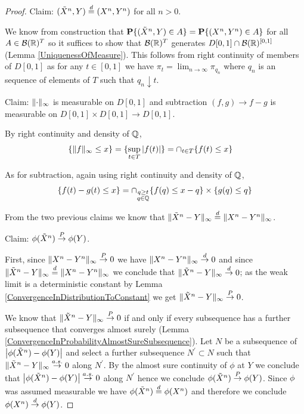 \begin{proof}
Claim: $(\tilde{X}^n, Y) \overset{d}= (X^n, Y^n)$ for all $n > 0$.

We know from construction that $\textbf{P}\{(\tilde{X}^n, Y) \in A\} =
\textbf{P}\{(X^n,Y^n) \in A\}$ for all $A \in \mathcal{B}(\mathbb{R})^T$
so it suffices to show that $\mathcal{B}(\mathbb{R})^T$ generates $D[0,1]
\cap \mathcal{B}(\mathbb{R})^{[0,1]}$ (Lemma \ref{UniquenessOfMeasure}).
This follows from right continuity of members of $D[0,1]$ as for any
$t \in [0,1]$ we have $\pi_t =\lim_{n \to \infty} \pi_{q_n}$ where
$q_n$ is an sequence of elements of $T$ such that $q_n \downarrow t$.

Claim: $\lVert \cdot \rVert_\infty$ is measurable on $D[0,1]$ and
subtraction $(f,g) \to f - g$ is measurable on $D[0,1] \times D[0,1]
\to D[0,1]$.

By right continuity and density of $\mathbb{Q}$, 
\begin{align*}
\lbrace \lVert f \rVert_\infty \leq x \rbrace &= \lbrace \sup_{t \in T}
\left \vert f(t) \right \vert \rbrace = \cap_{t \in T} \lbrace f(t) \leq x \rbrace
\end{align*}

As for subtraction, again using right continuity and density of
$\mathbb{Q}$,
\begin{align*}
\lbrace f(t) - g(t) \leq x \rbrace = \cap_{\substack{q \geq t \\ q \in
    \mathbb{Q}}} \lbrace f(q) \leq x - q \rbrace \times \lbrace g(q) \leq q \rbrace
\end{align*}

From the two previous claims we know that $\lVert \tilde{X}^n -
  Y \rVert_\infty \overset{d}= \lVert X^n - Y^n \rVert_\infty$.

Claim: $\phi(\tilde{X}^n) \overset{P}\to \phi(Y)$.

First, since $\lVert X^n - Y^n \rVert_\infty \overset{P}\to 0$ we have  $\lVert X^n -
  Y^n \rVert_\infty \overset{d}\to 0$ and since $\lVert \tilde{X}^n -
  Y \rVert_\infty \overset{d}= \lVert X^n - Y^n \rVert_\infty$ we conclude that $\lVert \tilde{X}^n -
  Y \rVert_\infty \overset{d}\to 0$; as the weak limit is a deterministic constant by Lemma
\ref{ConvergenceInDistributionToConstant} we get $\lVert \tilde{X}^n -
  Y \rVert_\infty \overset{P}\to 0$.

We know that $\lVert \tilde{X}^n -  Y \rVert_\infty \overset{P}\to 0$ if and only if
every subsequence has a further subsequence that converges almost
surely (Lemma \ref{ConvergenceInProbabilityAlmostSureSubsequence}).
Let $N$ be a subsequence of $\left \vert \phi(\tilde{X}^n) - \phi(Y) \right \vert$ and
select a further subsequence $N^\prime \subset N$ such that
$\lVert \tilde{X}^n - Y \rVert_\infty \overset{a.s.}\to 0$ along $N^\prime$.  By the
almost sure continuity of $\phi$ at $Y$ we conclude that
$\left \vert \phi(\tilde{X}^n) - \phi(Y) \right \vert \overset{a.s.}\to 0$ along $N^\prime$ hence we
conclude $\phi(\tilde{X}^n) \overset{P}\to \phi(Y)$.  Since $\phi$ was
assumed measurable we have $\phi(\tilde{X}^n) \overset{d}= \phi(X^n)$ and
therefore we conclude $\phi(X^n) \overset{d}\to \phi(Y)$.
\end{proof}

